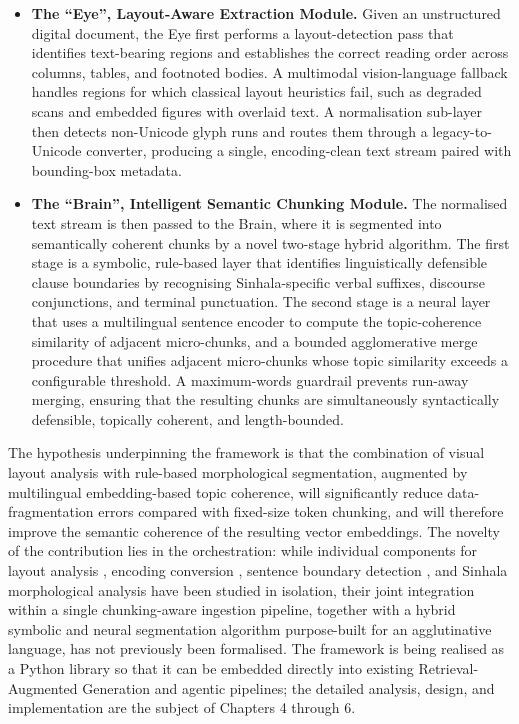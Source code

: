 \documentclass[12pt,a4paper,oneside]{report}
\begin{document}
\begin{itemize}[leftmargin=2em]
    \item \textbf{The ``Eye'', Layout-Aware Extraction Module.} Given an unstructured digital document, the Eye first performs a layout-detection pass that identifies text-bearing regions and establishes the correct reading order across columns, tables, and footnoted bodies. A multimodal vision-language fallback handles regions for which classical layout heuristics fail, such as degraded scans and embedded figures with overlaid text. A normalisation sub-layer then detects non-Unicode glyph runs and routes them through a legacy-to-Unicode converter, producing a single, encoding-clean text stream paired with bounding-box metadata.

    \item \textbf{The ``Brain'', Intelligent Semantic Chunking Module.} The normalised text stream is then passed to the Brain, where it is segmented into semantically coherent chunks by a novel two-stage hybrid algorithm. The first stage is a symbolic, rule-based layer that identifies linguistically defensible clause boundaries by recognising Sinhala-specific verbal suffixes, discourse conjunctions, and terminal punctuation. The second stage is a neural layer that uses a multilingual sentence encoder \cite{feng2022labse} to compute the topic-coherence similarity of adjacent micro-chunks, and a bounded agglomerative merge procedure that unifies adjacent micro-chunks whose topic similarity exceeds a configurable threshold. A maximum-words guardrail prevents run-away merging, ensuring that the resulting chunks are simultaneously syntactically defensible, topically coherent, and length-bounded.
\end{itemize}

The hypothesis underpinning the framework is that the combination of visual layout analysis with rule-based morphological segmentation, augmented by multilingual embedding-based topic coherence, will significantly reduce data-fragmentation errors compared with fixed-size token chunking, and will therefore improve the semantic coherence of the resulting vector embeddings. The novelty of the contribution lies in the orchestration: while individual components for layout analysis \cite{wickramasinghe2024unet}, encoding conversion \cite{webapps2025converter}, sentence boundary detection \cite{ruwanpathirana2015sentence}, and Sinhala morphological analysis \cite{pathirana2025sinmorphy} have been studied in isolation, their joint integration within a single chunking-aware ingestion pipeline, together with a hybrid symbolic and neural segmentation algorithm purpose-built for an agglutinative language, has not previously been formalised. The framework is being realised as a Python library so that it can be embedded directly into existing Retrieval-Augmented Generation and agentic pipelines; the detailed analysis, design, and implementation are the subject of Chapters 4 through 6.
\end{document}
